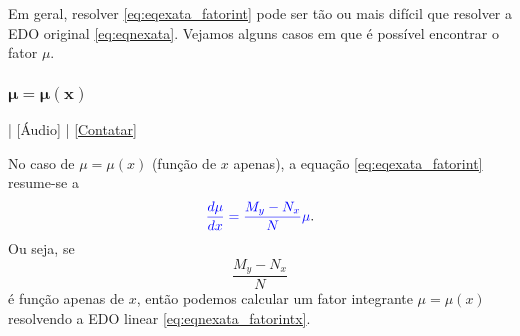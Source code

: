 Em geral, resolver \eqref{eq:eqexata_fatorint} pode ser tão ou mais difícil que resolver a EDO original \eqref{eq:eqnexata}. Vejamos alguns casos em que é possível encontrar o fator $\mu$.

\subsubsection{$\pmb{\mu = \mu(x)}$}

\begin{flushright}
  [Vídeo] | [Áudio] | \href{https://phkonzen.github.io/notas/contato.html}{[Contatar]}
\end{flushright}

No caso de $\mu = \mu(x)$ (função de $x$ apenas), a equação \eqref{eq:eqexata_fatorint} resume-se a
\begin{equation}\label{eq:eqnexata_fatorintx}
  {\color{blue}\frac{d\mu}{dx} = \frac{M_y-N_x}{N}\mu}.
\end{equation}
Ou seja, se
\begin{equation}
  \frac{M_y-N_x}{N}
\end{equation}
é função apenas de $x$, então podemos calcular um fator integrante $\mu = \mu(x)$ resolvendo a EDO linear \eqref{eq:eqnexata_fatorintx}.


